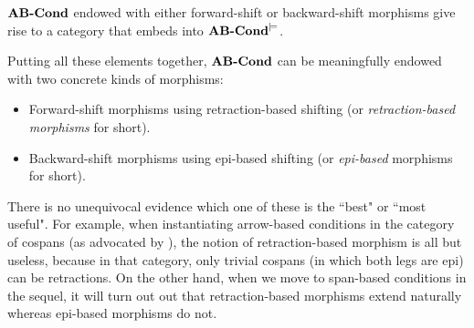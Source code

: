 \begin{proposition}
$\textbf{AB-Cond}$ endowed with either forward-shift or backward-shift morphisms give rise to a category that embeds into $\textbf{AB-Cond}^{\models}$.
\end{proposition}
%
Putting all these elements together, $\textbf{AB-Cond}$ can be meaningfully endowed with two concrete kinds of morphisms:

\begin{itemize}
\item Forward-shift morphisms using retraction-based shifting (or \emph{retraction-based morphisms} for short).
\item Backward-shift morphisms using epi-based shifting (or \emph{epi-based} morphisms for short).
\end{itemize}
%
There is no unequivocal evidence which one of these is the ``best" or ``most useful". For example, when instantiating arrow-based conditions in the category of cospans (as advocated by \cite{Koenig et al}), the notion of retraction-based morphism is all but useless, because in that category, only trivial cospans (in which both legs are epi) can be retractions. On the other hand, when we move to span-based conditions in the sequel, it will turn out out that retraction-based morphisms extend naturally whereas epi-based morphisms do not.

